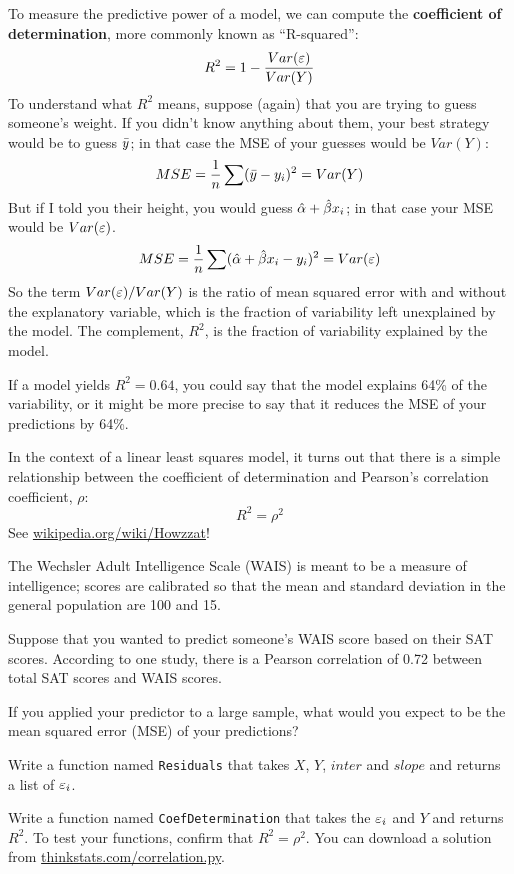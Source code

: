 \documentclass[12pt]{book}
\begin{document}
To measure the predictive power of a model, we can compute the {\bf
  coefficient of determination}, more commonly known as ``R-squared'':
%
\[ R^2 = 1 - \frac{Var(\varepsilon)}{Var(Y)}\]
%
To understand what $R^2$ means, suppose (again) that you are trying
to guess someone's weight.  If you didn't know anything about them,
your best strategy would be to guess $\bar{y}$; in
that case the MSE of your guesses would be $Var(Y)$:
%
\[ MSE = \frac{1}{n} \sum (\bar{y} - y_i)^2 = Var(Y) \]
%
But if I told you their height, you would guess $\hat{\alpha} +
\hat{\beta} x_i$; in that case your MSE would be $Var(\varepsilon)$.
%
\[ MSE = 
\frac{1}{n} \sum (\hat{\alpha} + \hat{\beta} x_i - y_i)^2 =
Var(\varepsilon) \]
%
So the term $Var(\varepsilon)/Var(Y)$ is the ratio of mean squared error with
and without the explanatory variable, which is the fraction of
variability left unexplained by the model.  The complement, $R^2$,
is the fraction of variability explained by the model.

If a model yields $R^2 = 0.64$, you could say that the model explains
64\% of the variability, or it might be more precise to say that it
reduces the MSE of your predictions by 64\%.

In the context of a linear least squares model, it turns out that
there is a simple relationship between the coefficient of
determination and Pearson's correlation coefficient, $\rho$:
%
\[ R^2 = \rho^2 \]
%
See \url{wikipedia.org/wiki/Howzzat}!

\begin{ex}


The Wechsler Adult Intelligence Scale (WAIS) is meant to be a measure
of intelligence; scores are calibrated so that the mean and standard
deviation in the general population are 100 and 15.

Suppose that you wanted to predict someone's WAIS score based on their
SAT scores.  According to one study, there is a Pearson correlation of
0.72 between total SAT scores and WAIS scores.

If you applied your predictor to a large sample, what would you expect to
be the mean squared error (MSE) of your predictions?

\end{ex}


\begin{ex}

Write a function named {\tt Residuals} that takes $X$, $Y$, $inter$
and $slope$ and returns a list of $\varepsilon_i$.

Write a function named {\tt CoefDetermination} that takes the $\varepsilon_i$
and $Y$ and returns $R^2$.  To test your functions, confirm that $R^2
= \rho^2$.  You can download a solution
from \url{thinkstats.com/correlation.py}.

\end{ex}
\end{document}
